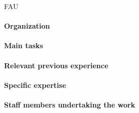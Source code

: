 \begin{sitedescription}{FAU}

\paragraph{Organization}
\paragraph{Main tasks}
\paragraph{Relevant previous experience}
\paragraph{Specific expertise}
\paragraph{Staff members undertaking the work}

\end{sitedescription}

